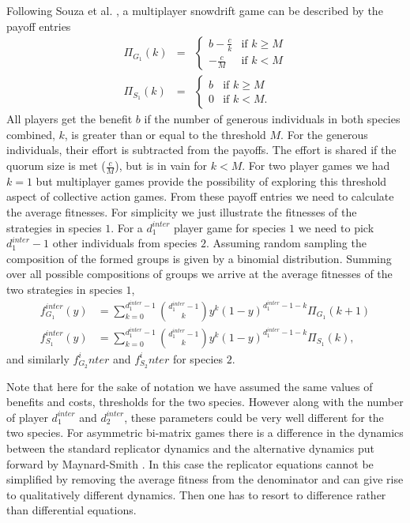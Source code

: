 \documentclass[12pt]{article}
\begin{document}
\begin{appendices}
Following Souza et al. \citep{souza:JTB:2009},  
a multiplayer snowdrift game can be described by the payoff entries
\begin{eqnarray}
\Pi_{G_1} (k)  &=& \begin{cases} b-\frac{c}{k} & \textrm{if } k \geq M \\  -\frac{c}{M} & \textrm{if } k < M \end{cases} 
\\
\Pi_{S_1} (k)  &=& \begin{cases} b & \textrm{if } k \geq M \\ 0 & \textrm{if } k < M. \end{cases}
\label{eqintergamepayoffs}
\end{eqnarray}
%
All players get the benefit $b$ if the number of generous individuals in both species combined, $k$, is greater than or equal to the threshold $M$.
For the generous individuals, their effort is subtracted from the payoffs.
The effort is shared if the quorum size is met ($\frac{c}{M}$), but is in vain for $k<M$. 
For two player games we had $k=1$ but multiplayer games provide the possibility of exploring this threshold aspect of collective action games.
From these payoff entries we need to calculate the average fitnesses.
For simplicity we just illustrate the fitnesses of the strategies in species $1$.
For a $d_1^{inter}$ player game for species $1$ we need to pick $d_1^{inter}-1$ other individuals from species $2$.
Assuming random sampling the composition of the formed groups is given by a binomial distribution.
Summing over all possible compositions of groups we arrive at  the average fitnesses of the two strategies in species $1$,
%
\begin{align}
f^{inter}_{G_1} (y) &= \sum_{k=0}^{d_1^{inter} -1} \binom{d_1^{inter} -1}{k}y^k (1-y)^{d_1^{inter} -1-k} \Pi_{G_1}(k+1)  \\
f^{inter}_{S_1} (y) &= \sum_{k=0}^{d_1^{inter} -1} \binom{d_1^{inter} -1}{k}y^k (1-y)^{d_1^{inter} -1-k} \Pi_{S_1}(k),
\label{interfiteqs}
\end{align}
%
and similarly $f_{G_2}^inter$ and $f_{S_2}^inter$ for species $2$.

Note that here for the sake of notation we have assumed the same values of benefits and costs, thresholds for the two species. However along with the number of player $d_1^{inter}$ and $d_2^{inter}$, these parameters could be very well different for the two species.
For asymmetric bi-matrix games there is a difference in the dynamics between the standard replicator dynamics and the alternative dynamics put forward by Maynard-Smith \citep{maynard-smith:book:1982}.
In this case the replicator equations cannot be simplified by removing the average fitness from the denominator and can give rise to qualitatively different dynamics. 
Then one has to resort to difference rather than differential equations.


\end{appendices}
\end{document}
